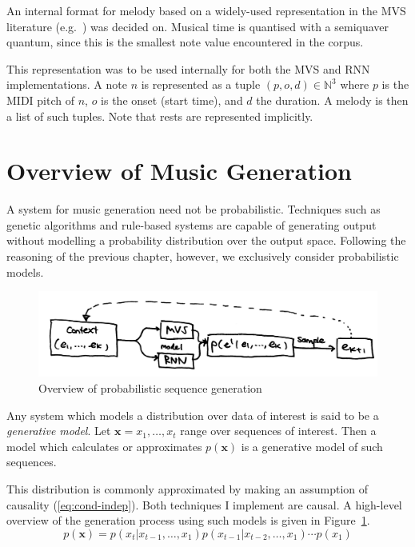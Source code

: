 \documentclass[12pt,a4paper,twoside,openright]{report}
\newcommand{\vect}[1]{\boldsymbol{\mathbf{#1}}}
\begin{document}
An internal format for melody based on a widely-used representation in the MVS
literature (e.g.\ \cite{conklin1995viewpoints}) was decided on. Musical time is
quantised with a semiquaver quantum, since this is the smallest note value
encountered in the corpus.

This representation was to be used internally for both the MVS and RNN
implementations. A note $n$ is represented as a tuple $(p,o,d) \in \mathbb{N}^3$
where $p$ is the MIDI pitch of $n$, $o$ is the onset (start time), and $d$ the
duration. A melody is then a list of such tuples. Note that rests are
represented implicitly.

\section{Overview of Music Generation}\label{sec:gen-models}

A system for music generation need not be probabilistic. Techniques such as
genetic algorithms and rule-based systems are capable of generating output
without modelling a probability distribution over the output space. Following
the reasoning of the previous chapter, however, we exclusively consider
probabilistic models. 

\begin{figure}[H]
\centering
\includegraphics[width=400pt]{figs/high_level_tmp.jpg}
\caption{Overview of probabilistic sequence generation}
\label{fig:seq-gen-overview}
\end{figure}

Any system which models a distribution over data of interest is said to be a
\emph{generative model}. Let $\vect{x} = x_1, \ldots, x_t$ range over sequences
of interest. Then a model which calculates or approximates $p(\vect{x})$ is a
generative model of such sequences.

This distribution is commonly approximated by making an assumption of causality
(\ref{eq:cond-indep}). Both techniques I implement are causal. A high-level
overview of the generation process using such models is given in
Figure~\ref{fig:seq-gen-overview}.
\begin{equation}
  p(\vect{x}) = p(x_t | x_{t-1}, \ldots, x_1) p(x_{t-1} | x_{t-2},
  \ldots, x_1) \cdots p(x_1) \label{eq:cond-indep}
\end{equation} 
\end{document}
